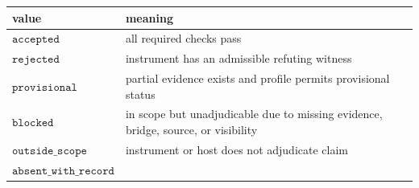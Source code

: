 \documentclass[11pt]{article}
\theoremstyle{definition}
\begin{document}
\begin{longtable}[]{@{}ll@{}}
\toprule
\begin{minipage}[b]{0.26\columnwidth}\raggedright
value\strut
\end{minipage} & \begin{minipage}[b]{0.68\columnwidth}\raggedright
meaning\strut
\end{minipage}\tabularnewline
\midrule
\endhead
\begin{minipage}[t]{0.26\columnwidth}\raggedright
\(\texttt{accepted}\)\strut
\end{minipage} & \begin{minipage}[t]{0.68\columnwidth}\raggedright
all required checks pass\strut
\end{minipage}\tabularnewline
\begin{minipage}[t]{0.26\columnwidth}\raggedright
\(\texttt{rejected}\)\strut
\end{minipage} & \begin{minipage}[t]{0.68\columnwidth}\raggedright
instrument has an admissible refuting witness\strut
\end{minipage}\tabularnewline
\begin{minipage}[t]{0.26\columnwidth}\raggedright
\(\texttt{provisional}\)\strut
\end{minipage} & \begin{minipage}[t]{0.68\columnwidth}\raggedright
partial evidence exists and profile permits provisional status\strut
\end{minipage}\tabularnewline
\begin{minipage}[t]{0.26\columnwidth}\raggedright
\(\texttt{blocked}\)\strut
\end{minipage} & \begin{minipage}[t]{0.68\columnwidth}\raggedright
in scope but unadjudicable due to missing evidence, bridge, source, or visibility\strut
\end{minipage}\tabularnewline
\begin{minipage}[t]{0.26\columnwidth}\raggedright
\(\texttt{outside\_scope}\)\strut
\end{minipage} & \begin{minipage}[t]{0.68\columnwidth}\raggedright
instrument or host does not adjudicate claim\strut
\end{minipage}\tabularnewline
\begin{minipage}[t]{0.26\columnwidth}\raggedright
\(\texttt{absent\_with\_record}\)\strut
\end{minipage} & \begin{minipage}[t]{0.68\columnwidth}\raggedright

\end{minipage}
\end{longtable}
\end{document}
